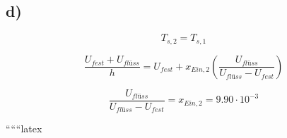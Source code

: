 

\subsection*{d)}
\begin{equation*}
T_{s,2} = T_{s,1}
\end{equation*}

\begin{equation*}
\frac{U_{fest} + U_{flüss}}{h} = U_{fest} + x_{Ein,2} \left( \frac{U_{flüss}}{U_{flüss} - U_{fest}} \right)
\end{equation*}

\begin{equation*}
\frac{U_{flüss}}{U_{flüss} - U_{fest}} = x_{Ein,2} = 9.90 \cdot 10^{-3}
\end{equation*}

``````latex